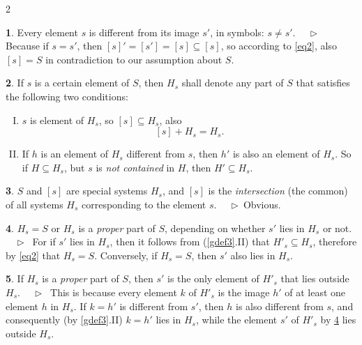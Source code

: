 \documentclass[leqno,hidelinks,10pt]{article}
\theoremstyle{definition}
\newtheorem{satz}{\protect\satzname}
\newtheorem{deff}[satz]{\protect\deffname}
\newcommand{\satzname}{}
\newcommand{\deffname}{}
\renewcommand{\satzname}{\hspace{-4pt}.\ Satz}%
\renewcommand{\deffname}{\hspace{-4pt}.\ Definition}%
\renewcommand{\satzname}{\hspace{-4pt}.\ Theorem}%
\renewcommand{\deffname}{\hspace{-4pt}.\ Definition}%
\newcommand\Beweis{\medskip \newline $ \phantom{'.'} \rhd \ $}%
\newcommand{\partof}{\subseteq}
\newcommand{\sref}[1]{\underline{\ref{#1}}}%
\begin{document}
\begin{paracol}{2}
\begin{rightcolumn}
\begin{satz}\label{thm2}
Every element $s$ is different from its image $s'$, in symbols: $s \neq s'$.
\Beweis
Because if $s = s'$, then $[s]' = [s'] = [s] \partof [s]$, so according to
\eqref{eq2}, also $[s] = S$ in contradiction to our assumption about $S$.
\end{satz}

\newpage

\begin{deff}\label{def3}
If $s$ is a certain element of $S$, then $H_s$ shall denote any part of $S$ that
satisfies the following two conditions:
\vspace{8pt} %

\begin{enumerate}[I.]
\item $s$ is element of $H_s$, so $[s] \partof H_s$, also
\[
    [s] + H_s = H_s.
\]
\item If $h$ is an element of $H_s$ different from $s$, then $h'$ is also an
element of $H_s$. So if $H \partof H_s$, but $s$ is \emph{not contained} in $H$,
then $H' \partof H_s$.
\end{enumerate}
\end{deff}

\begin{satz}\label{thm4}
$S$ and $[s]$ are special systems $H_s$, and $[s]$ is the \emph{intersection}
(the common) of all systems $H_s$ corresponding to the element $s$.
\Beweis Obvious. \end{satz}

\begin{satz}\label{thm5}
$H_s = S$ or $H_s$ is a \textit{proper} part of $S$, depending on whether
$s'$ lies in $H_s$ or not.
\Beweis
For if $s'$ lies in $H_s$, then it follows from (\sref{gdef3}.II)
that $H'_s \partof H_s$, therefore by \eqref{eq2} that $H_s = S$. Conversely,
if $H_s = S$, then $s'$ also lies in $H_s$.
\end{satz}

\begin{satz}\label{thm6}
If $H_s$ is a \emph{proper} part of $S$, then $s'$ is the only element of
$H'_s$ that lies outside $H_s$.
\Beweis
This is because every element $k$ of $H'_s$ is the image $h'$ of at least one
element $h$ in $H_s$. If $k=h'$ is different from $s'$, then $h$ is also different
from $s$, and consequently (by \sref{gdef3}.II) $k = h'$ lies in
$H_s$, while the element $s'$ of $H'_s$ by \sref{thm5} lies outside $H_s$.
\end{satz}


\end{rightcolumn}
\end{paracol}
\end{document}
